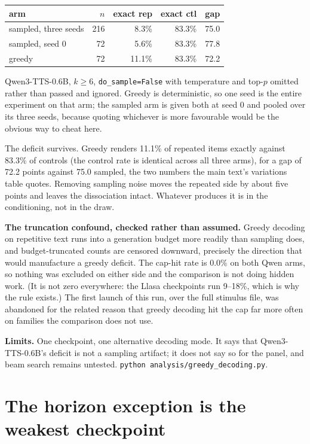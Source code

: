 \documentclass[11pt]{article}
\begin{document}
\begin{center}
\begin{tabular}{lrrrr}
\toprule
arm & $n$ & exact rep & exact ctl & gap \\
\midrule
sampled, three seeds & 216 & 8.3\%  & 83.3\% & 75.0 \\
sampled, seed 0      &  72 & 5.6\%  & 83.3\% & 77.8 \\
greedy               &  72 & 11.1\% & 83.3\% & 72.2 \\
\bottomrule
\end{tabular}
\end{center}

\noindent Qwen3-TTS-0.6B, $k\ge6$, \texttt{do\_sample=False} with temperature and
top-$p$ omitted rather than passed and ignored. Greedy is deterministic, so one
seed is the entire experiment on that arm; the sampled arm is given both at seed
0 and pooled over its three seeds, because quoting whichever is more favourable
would be the obvious way to cheat here.

The deficit survives. Greedy renders 11.1\% of repeated items exactly against
83.3\% of controls (the control rate is identical across all three arms), for
a gap of 72.2 points against 75.0 sampled, the two numbers the main text's
variations table quotes. Removing sampling noise moves the
repeated side by about five points and leaves the dissociation intact. Whatever
produces it is in the conditioning, not in the draw.

\noindent\textbf{The truncation confound, checked rather than assumed.} Greedy
decoding on repetitive text runs into a generation budget more readily than
sampling does, and budget-truncated counts are censored downward, precisely
the direction that would manufacture a greedy deficit. The cap-hit rate is
$0.0\%$ on both Qwen arms, so nothing was excluded on either side and the
comparison is not doing hidden work. (It is not zero everywhere: the Llasa
checkpoints run 9--18\%, which is why the rule exists.) The first launch of this
run, over the full stimulus file, was abandoned for the related reason that
greedy decoding hit the cap far more often on families the comparison does not
use.

\noindent\textbf{Limits.} One checkpoint, one alternative decoding mode. It says
that Qwen3-TTS-0.6B's deficit is not a sampling artifact; it does not say so for
the panel, and beam search remains untested. \texttt{python
analysis/greedy\_decoding.py}.


\section{The horizon exception is the weakest checkpoint}
\end{document}
